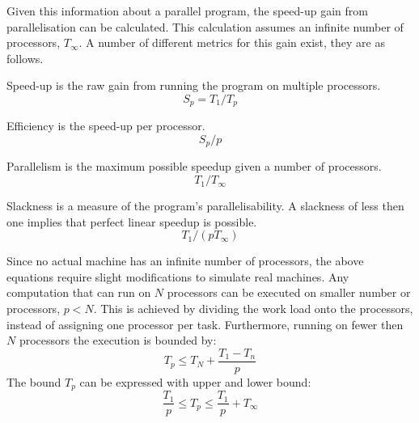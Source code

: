 Given this information about a parallel program, the speed-up gain from parallelisation can be calculated. This calculation assumes an infinite number of processors, $T_\infty$. A number of different metrics for this gain exist, they are as follows.
\begin{labeling}{\quad\quad}
    \item[Speed-up] is the raw gain from running the program on multiple processors.
    \begin{equation*}
        S_p = T_1/T_p
    \end{equation*}
    \item[Efficiency] is the speed-up per processor.
    \begin{equation*}
        S_p/p
    \end{equation*}
    \item[Parallelism] is the maximum possible speedup given a number of processors.
    \begin{equation*}
        T_1/T_\infty
    \end{equation*}
    \item[Slackness] is a measure of the program's parallelisability. A slackness of less then one implies that perfect linear speedup is possible.
    \begin{equation*}
        T_1/(pT_\infty)
    \end{equation*}
\end{labeling}
Since no actual machine has an infinite number of processors, the above equations require slight modifications to simulate real machines. Any computation that can run on $N$ processors can be executed on smaller number or processors, $p < N$\cite{Gustafson2011}. This is achieved by dividing the work load onto the processors, instead of assigning one processor per task. Furthermore, running on fewer then $N$ processors the execution is bounded by:
\begin{equation*}
    T_p \leq T_N + \frac{T_1 - T_n}{p}
\end{equation*}
The bound $T_p$ can be expressed with upper and lower bound\cite{brent1974parallel}:
\begin{equation*}
    \frac{T_1}{p} \leq T_p \leq \frac{T_1}{p} + T_\infty
\end{equation*}
